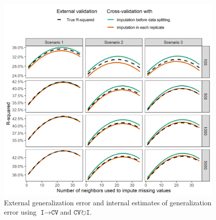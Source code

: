 \documentclass[AMA,STIX1COL,doublespace]{WileyNJD-v2}
\begin{document}
\begin{figure}
\includegraphics[width=1\linewidth]{figs/fig_trends_by_nbrs} 
\caption{External generalization error and internal estimates of generalization error using $\texttt{I}\!\!\rightarrow\!\texttt{CV}$\space and $\texttt{CV}\!\circlearrowright\!\texttt{I}$.}
\label{fig:sim_r2}
\end{figure}

\FloatBarrier


\end{document}
